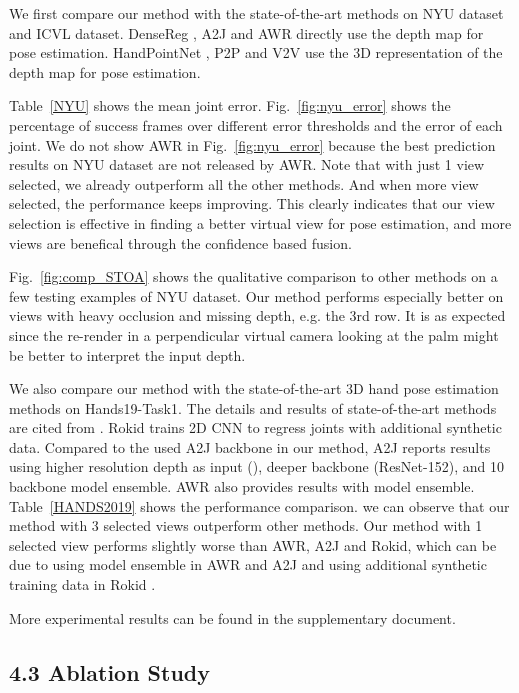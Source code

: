 \documentclass[letterpaper]{article} \usepackage{aaai22}  \usepackage{times}  \usepackage{helvet}  \usepackage{courier}  \usepackage[hyphens]{url}  \usepackage{graphicx} \urlstyle{rm} \def\UrlFont{\rm}  \usepackage{natbib}  \usepackage{caption} \DeclareCaptionStyle{ruled}{labelfont=normalfont,labelsep=colon,strut=off} \frenchspacing  \setlength{\pdfpagewidth}{8.5in}  \setlength{\pdfpageheight}{11in}  \usepackage{algorithm}
\begin{document}
We first compare our method with the state-of-the-art methods
on NYU dataset and ICVL dataset. 
DenseReg \cite{wan2018dense}, A2J \cite{xiong2019a2j} and AWR \cite{huang2020awr} directly use the depth map for pose estimation. HandPointNet \cite{ge2018_Point}, P2P \cite{ge2018point} and V2V \cite{moon2018v2v}\cite{hruz2021hand} use the 3D representation of the depth map for pose estimation.

Table~\ref{NYU} shows the mean joint error. Fig.~\ref{fig:nyu_error} shows the percentage of success frames over different error thresholds and the error of each joint. We do not show AWR in Fig.~\ref{fig:nyu_error} because the best prediction results on NYU dataset are not released by AWR.
Note that with just 1 view selected, we already outperform all the other methods. And when more view selected, the performance keeps improving.
This clearly indicates that our view selection is effective in finding a better virtual view for pose estimation, and more views are benefical through the confidence based fusion.

Fig.~\ref{fig:comp_STOA} shows the qualitative comparison to other methods on a few testing examples of NYU dataset.
Our method performs especially better on views with heavy occlusion and missing depth, e.g. the 3rd row.
It is as expected since the re-render in a perpendicular virtual camera looking at the palm might be better to interpret the input depth.

We also compare our method with the state-of-the-art 3D hand pose estimation methods 
on Hands19-Task1. The details and results of state-of-the-art methods are cited from \cite{armagan2020measuring}. {Rokid} \cite{zhang2020handaugment} trains 2D CNN to regress joints with additional synthetic data.
Compared to the used A2J backbone in our method, 
{A2J} \cite{xiong2019a2j} reports results using higher resolution depth as input (), deeper backbone (ResNet-152), and 10 backbone model ensemble. {AWR} \cite{huang2020awr} also provides results with model ensemble.
Table~\ref{HANDS2019} shows the performance comparison. we can observe that our method with 3 selected views outperform other methods.
Our method with 1 selected view performs slightly worse than {AWR}, {A2J} and {Rokid}, which can be due to
using model ensemble in {AWR} and {A2J} and using additional synthetic training data in {Rokid} \cite{zhang2020handaugment}.  

More experimental results can be found in the supplementary document.

\subsection{4.3 Ablation Study}
\end{document}
